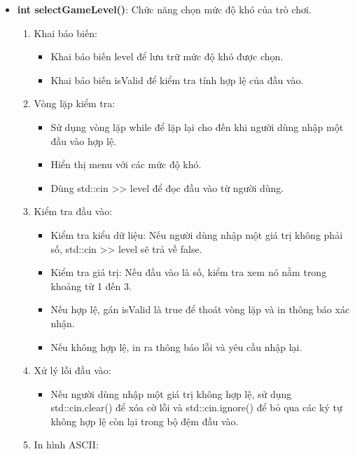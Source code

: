\documentclass{article}
\begin{document}
\begin{itemize}
    \item \textbf{int selectGameLevel()}: Chức năng chọn mức độ khó của trò chơi.
    \begin{description}
            \begin{enumerate}
            \item Khai báo biến:
                \begin{itemize}
                    \item Khai báo biến level để lưu trữ mức độ khó được chọn.
                    \item Khai báo biến isValid để kiểm tra tính hợp lệ của đầu vào.
                \end{itemize}
            \item Vòng lặp kiểm tra:
                \begin{itemize}
                    \item Sử dụng vòng lặp while để lặp lại cho đến khi người dùng nhập một đầu vào hợp lệ.
                    \item Hiển thị menu với các mức độ khó.
                    \item Dùng std::cin >> level để đọc đầu vào từ người dùng.
                \end{itemize}
            \item Kiểm tra đầu vào:
                \begin{itemize}
                    \item Kiểm tra kiểu dữ liệu: Nếu người dùng nhập một giá trị không phải số, std::cin >> level sẽ trả về false.
                    \item Kiểm tra giá trị: Nếu đầu vào là số, kiểm tra xem nó nằm trong khoảng từ 1 đến 3.
                    \item Nếu hợp lệ, gán isValid là true để thoát vòng lặp và in thông báo xác nhận.
                    \item Nếu không hợp lệ, in ra thông báo lỗi và yêu cầu nhập lại.
                \end{itemize} 
            \item Xử lý lỗi đầu vào:
            \begin{itemize}
                    \item Nếu người dùng nhập một giá trị không hợp lệ, sử dụng std::cin.clear() để xóa cờ lỗi và std::cin.ignore() để bỏ qua các ký tự không hợp lệ còn lại trong bộ đệm đầu vào.
                \end{itemize}
            \item In hình ASCII:

\end{enumerate}
\end{description}
\end{itemize}
\end{document}
